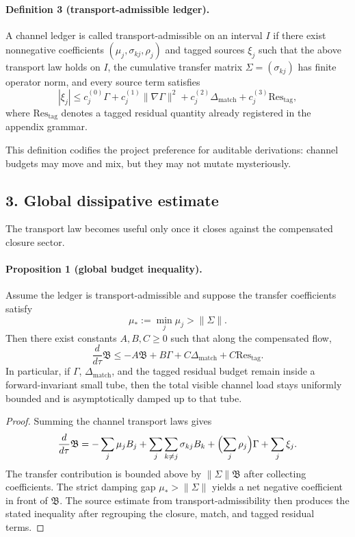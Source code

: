 \documentclass[12pt,a4paper]{article}
\begin{document}
\paragraph{Definition 3 (transport-admissible ledger).}
A channel ledger is called transport-admissible on an interval $I$ if there exist
nonnegative coefficients $(\mu_j,\sigma_{kj},\rho_j)$ and tagged sources $\xi_j$
such that the above transport law holds on $I$, the cumulative transfer matrix
$\Sigma=(\sigma_{kj})$ has finite operator norm, and every source term satisfies
\[
|\xi_j| \le c_j^{(0)}\Gamma + c_j^{(1)}\|\nabla\Gamma\|^2 + c_j^{(2)}\Delta_{\mathrm{match}}
+ c_j^{(3)}\mathrm{Res}_{\mathrm{tag}},
\]
where $\mathrm{Res}_{\mathrm{tag}}$ denotes a tagged residual quantity already
registered in the appendix grammar.

This definition codifies the project preference for auditable derivations: channel
budgets may move and mix, but they may not mutate mysteriously.

\subsection*{3. Global dissipative estimate}
The transport law becomes useful only once it closes against the compensated
closure sector.

\paragraph{Proposition 1 (global budget inequality).}
Assume the ledger is transport-admissible and suppose the transfer coefficients
satisfy
\[
\mu_* := \min_j \mu_j > \|\Sigma\|.
\]
Then there exist constants $A,B,C\ge0$ such that along the compensated flow,
\[
\frac{d}{d\tau}\mathfrak B
\le -A\mathfrak B + B\Gamma + C\Delta_{\mathrm{match}} + C\mathrm{Res}_{\mathrm{tag}}.
\]
In particular, if $\Gamma$, $\Delta_{\mathrm{match}}$, and the tagged residual budget
remain inside a forward-invariant small tube, then the total visible channel load
stays uniformly bounded and is asymptotically damped up to that tube.

\begin{proof}
Summing the channel transport laws gives
\[
\frac{d}{d\tau}\mathfrak B
= -\sum_j \mu_j B_j + \sum_j\sum_{k\neq j}\sigma_{kj}B_k
+ \Bigl(\sum_j \rho_j\Bigr)\Gamma + \sum_j \xi_j.
\]
The transfer contribution is bounded above by $\|\Sigma\|\mathfrak B$ after
collecting coefficients. The strict damping gap $\mu_*>\|\Sigma\|$ yields a net
negative coefficient in front of $\mathfrak B$. The source estimate from
transport-admissibility then produces the stated inequality after regrouping the
closure, match, and tagged residual terms.
\end{proof}
\end{document}

